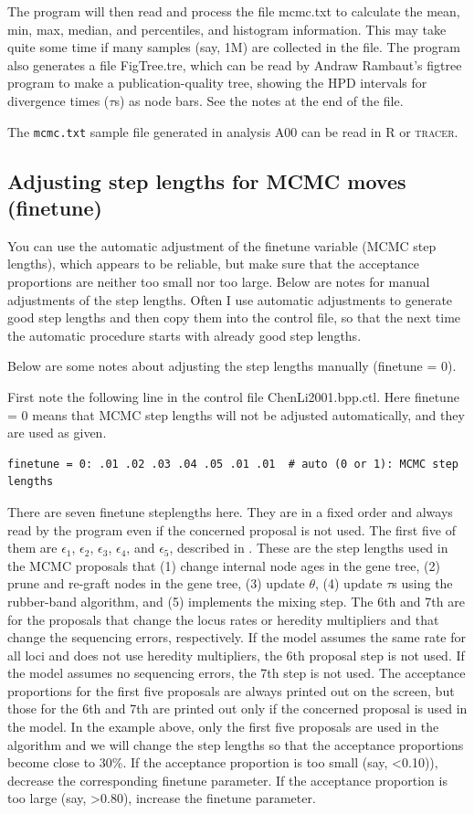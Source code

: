 \documentclass[a4paper]{book}
\numberwithin{equation}{section} \renewcommand{\baselinestretch}{0.55}
\begin{document}
The program will then read and process the file mcmc.txt to calculate
the mean, min, max, median, and percentiles, and histogram
information.  This may take quite some time if many samples (say, 1M)
are collected in the file.  The program also generates a file
FigTree.tre, which can be read by Andraw Rambaut’s figtree program to
make a publication-quality tree, showing the HPD intervals for
divergence times ($\tau$s) as node bars.  See the notes at the end of
the file.

The \texttt{mcmc.txt} sample file generated in analysis A00 can be
read in R or \textsc{tracer}.


\subsection{Adjusting step lengths for MCMC moves (finetune)}

You can use the automatic adjustment of the finetune variable (MCMC
step lengths), which appears to be reliable, but make sure that the
acceptance proportions are neither too small nor too large.  Below are
notes for manual adjustments of the step lengths.  Often I use
automatic adjustments to generate good step lengths and then copy them
into the control file, so that the next time the automatic procedure
starts with already good step lengths.

Below are some notes about adjusting the step lengths manually
(finetune = 0).

First note the following line in the control file ChenLi2001.bpp.ctl.
Here finetune = 0 means that MCMC step lengths will not be adjusted
automatically, and they are used as given.
\begin{verbatim}
finetune = 0: .01 .02 .03 .04 .05 .01 .01  # auto (0 or 1): MCMC step lengths
\end{verbatim}
There are seven finetune steplengths here.  They are in a fixed order
and always read by the program even if the concerned proposal is not
used.  The first five of them are $\epsilon_1$, $\epsilon_2$,
$\epsilon_3$, $\epsilon_4$, and $\epsilon_5$, described in
\citep{Rannala2003}. These are the step lengths used in the MCMC
proposals that (1) change internal node ages in the gene tree, (2)
prune and re-graft nodes in the gene tree, (3) update $\theta$, (4)
update $\tau$s using the rubber-band algorithm, and (5) implements the
mixing step.  The 6th and 7th are for the proposals that change the
locus rates or heredity multipliers and that change the sequencing
errors, respectively.  If the model assumes the same rate for all loci
and does not use heredity multipliers, the 6th proposal step is not
used.  If the model assumes no sequencing errors, the 7th step is not
used.  The acceptance proportions for the first five proposals are
always printed out on the screen, but those for the 6th and 7th are
printed out only if the concerned proposal is used in the model.  In
the example above, only the first five proposals are used in the
algorithm and we will change the step lengths so that the acceptance
proportions become close to 30\%.  If the acceptance proportion is too
small (say, <0.10)), decrease the corresponding finetune parameter.
If the acceptance proportion is too large (say, >0.80), increase the
finetune parameter.
\end{document}
